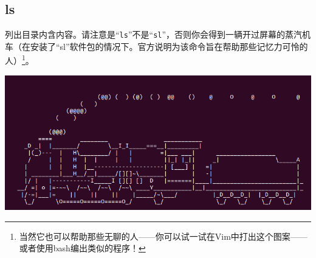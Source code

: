 \subsection{ls}
\cite{manls}\par
列出目录内含内容。请注意是“\verb|ls|”不是“\verb|sl|”，否则你会得到一辆开过屏幕的蒸汽机车（在安装了“sl”软件包的情况下。官方说明为该命令旨在帮助那些记忆力可怜的人）\footnote{当然它也可以帮助那些无聊的人——你可以试一试在Vim中打出这个图案——或者使用bash编出类似的程序！}。
\begin{center}
	\includegraphics[width=0.7\linewidth]{pic/sl}
\end{center} \par
